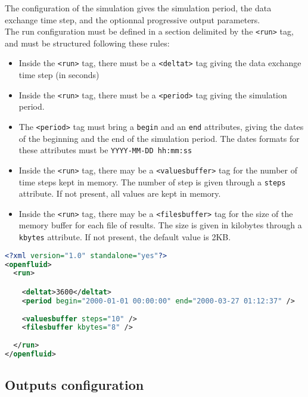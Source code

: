 The configuration of the simulation gives the simulation period, the data
exchange time step, and the optionnal progressive output parameters.\\
\noindent The run configuration must be defined in a section delimited by the
\texttt{<run>} tag, and must be structured following these rules:
\begin{itemize}
  \item Inside the \texttt{<run>} tag, there must be a \texttt{<deltat>} tag
  giving the data exchange time step (in seconds)
  \item Inside the \texttt{<run>} tag, there must be a \texttt{<period>} tag
  giving the simulation period.
  \item The \texttt{<period>} tag must bring a \texttt{begin} and an
  \texttt{end} attributes, giving the dates of the beginning and the end of the
  simulation period. The dates formats for these attributes must be
  \texttt{YYYY-MM-DD hh:mm:ss}
  \item Inside the \texttt{<run>} tag, there may be a \texttt{<valuesbuffer>}
  tag for the number of time steps kept in memory. The number of step is given
  through a \texttt{steps} attribute. If not present, all values are kept in memory.
  \item Inside the \texttt{<run>} tag, there may be a \texttt{<filesbuffer>}
  tag for the size of the memory buffer for each file of results. The size is given
  in kilobytes through a \texttt{kbytes} attribute. If not present, the default value 
  is 2KB.

\end{itemize}

\begin{lstlisting}[language=xml,title=\footnotesize\textit{example}]
<?xml version="1.0" standalone="yes"?>
<openfluid>
  <run>

    <deltat>3600</deltat>
    <period begin="2000-01-01 00:00:00" end="2000-03-27 01:12:37" />
    
    <valuesbuffer steps="10" />
    <filesbuffer kbytes="8" />
    
  </run>
</openfluid>
\end{lstlisting}

\bigskip

\subsection{Outputs configuration}

